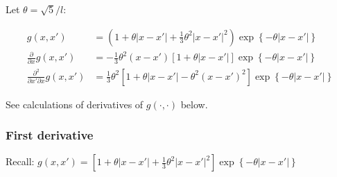 \documentclass{sfuthesis}
\begin{document}
Let $\theta = \sqrt{5} / l$:

\begin{align}
g\left( {x,x'} \right) &= \left( {1 + \theta \left| {x - x'} \right| + \frac{1}{3}{\theta ^2}{{\left| {x - x'} \right|}^2}} \right)\exp \left\{ { - \theta \left| {x - x'} \right|} \right\}\\
\frac{\partial }{{\partial x}}g\left( {x,x'} \right) &=  - \frac{1}{3}{\theta ^2}\left( {x - x'} \right)\left[ {1 + \theta \left| {x - x'} \right|} \right]\exp \left\{ { - \theta \left| {x - x'} \right|} \right\}\\
\frac{{{\partial ^2}}}{{\partial x'\partial x}}g\left( {x,x'} \right) &= \frac{1}{3}{\theta ^2}\left[ {1 + \theta \left| {x - x'} \right| - {\theta ^2}{{\left( {x - x'} \right)}^2}} \right]\exp \left\{ { - \theta \left| {x - x'} \right|} \right\}
\end{align}
    
See calculations of derivatives of $g(\cdot, \cdot)$ below.



\bigskip

\subsubsection{First derivative}

Recall: $g\left( {x,x'} \right) = \left[ {1 + \theta \left| {x - x'} \right| + \frac{1}{3}{\theta ^2}{{\left| {x - x'} \right|}^2}} \right]\exp \left\{ { - \theta \left| {x - x'} \right|} \right\}$
\end{document}
